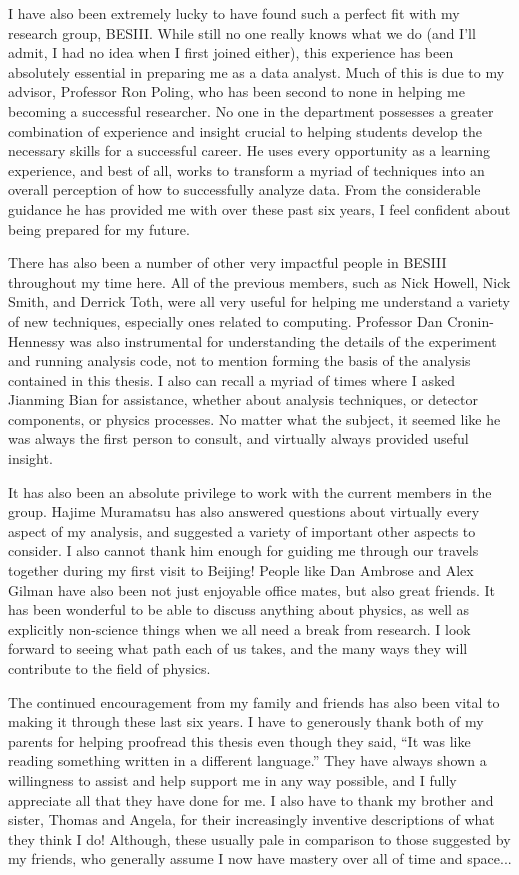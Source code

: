 I have also been extremely lucky to have found such a perfect fit with my research group, BESIII.
While still no one really knows what we do (and I'll admit, I had no idea when I first joined either), this experience has been absolutely essential in preparing me as a data analyst.
Much of this is due to my advisor, Professor Ron Poling, who has been second to none in helping me becoming a successful researcher.
No one in the department possesses a greater combination of experience and insight crucial to helping students develop the necessary skills for a successful career.
He uses every opportunity as a learning experience, and best of all, works to transform a myriad of techniques into an overall perception of how to successfully analyze data.
From the considerable guidance he has provided me with over these past six years, I feel confident about being prepared for my future.

There has also been a number of other very impactful people in BESIII throughout my time here.
All of the previous members, such as Nick Howell, Nick Smith, and Derrick Toth, were all very useful for helping me understand a variety of new techniques, especially ones related to computing.
Professor Dan Cronin-Hennessy was also instrumental for understanding the details of the experiment and running analysis code, not to mention forming the basis of the analysis contained in this thesis.
I also can recall a myriad of times where I asked Jianming Bian for assistance, whether about analysis techniques, or detector components, or physics processes.
No matter what the subject, it seemed like he was always the first person to consult, and virtually always provided useful insight.

It has also been an absolute privilege to work with the current members in the group.
Hajime Muramatsu has also answered questions about virtually every aspect of my analysis, and suggested a variety of important other aspects to consider.
I also cannot thank him enough for guiding me through our travels together during my first visit to Beijing!
People like Dan Ambrose and Alex Gilman have also been not just enjoyable office mates, but also great friends.
It has been wonderful to be able to discuss anything about physics, as well as explicitly non-science things when we all need a break from research.
I look forward to seeing what path each of us takes, and the many ways they will contribute to the field of physics.

The continued encouragement from my family and friends has also been vital to making it through these last six years.
I have to generously thank both of my parents for helping proofread this thesis even though they said, ``It was like reading something written in a different language.''
They have always shown a willingness to assist and help support me in any way possible, and I fully appreciate all that they have done for me.
I also have to thank my brother and sister, Thomas and Angela, for their increasingly inventive descriptions of what they think I do!
Although, these usually pale in comparison to those suggested by my friends, who generally assume I now have mastery over all of time and space...

